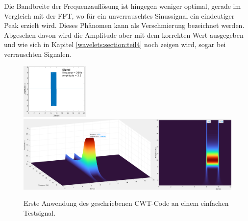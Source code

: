 Die Bandbreite der Frequenzauflösung ist hingegen weniger optimal, gerade im Vergleich mit der FFT, wo für ein unverrauschtes Sinussignal ein eindeutiger Peak erzielt wird.
Dieses Phänomen kann als Verschmierung bezeichnet werden. Abgesehen davon wird die Amplitude aber mit dem korrekten Wert ausgegeben und wie sich in Kapitel \ref{wavelets:section:teil4} noch zeigen wird, sogar bei verrauschten Signalen.

\begin{figure}
	\centering
	\includegraphics[width=0.3\textwidth]{papers/wavelets/images/8_BC_Signal.png}
	\includegraphics[width=\textwidth]{papers/wavelets/images/12-2_CWT-1Prog.png}
	\caption{Erste Anwendung des geschriebenen CWT-Code an einem einfachen Testsignal.}
	\label{wavelet:fig:ErsteAnwendung}
\end{figure}

